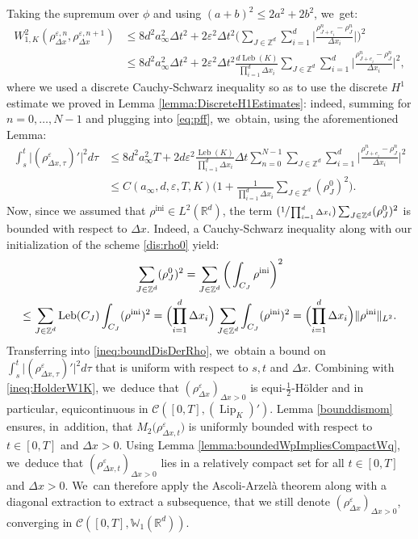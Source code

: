 \documentclass[11pt]{article}
\numberwithin{equation}{section}
\newcommand{\Psfrac}[2]{(\sfrac{#1}{#2})}
\newcommand{\ini}{\mathrm{ini}}
\DeclareMathOperator{\Leb}{Leb}
\DeclareMathOperator{\Lip}{Lip}
\def\RR{\mathbb{R}}
\def\ZZ{\mathbb{Z}}
\def\WW{\mathbb{W}}
\def\eps{\varepsilon}
\def\dt{\Delta t}
\def\dx{\Delta x}
\def\calC{{\mathcal C}}
\theoremstyle{plain}
\theoremstyle{definition}
\begin{document}
Taking the supremum over $\phi$ and using $(a + b)^2 \leq 2a^2 + 2b^2$, we~get:
\begin{align*}
W_{1,K}^2(\rho_{\dx}^{\eps,n}, \rho_{\dx}^{\eps,n+1}) & \leq 8d^2 a_\infty^2 \dt^2 + 2\eps^2 \dt^2 \bigg(\sum_{J \in \ZZ^d} \sum_{i=1}^{d} \Big|\frac{\rho_{J+e_i}^{n} - \rho_J^{n}}{\dx_i}\Big|\bigg)^2 \\
& \leq 8d^2 a_\infty^2 \dt^2 + 2 \eps^2 \dt^2 \frac{d \Leb(K)}{\prod_{i=1}^d \dx_i} \sum_{J \in \ZZ^d} \sum_{i=1}^{d} \Big|\frac{\rho_{J+e_i}^{n} - \rho_J^{n}}{\dx_i}\Big|^2,
\end{align*}
where we used a discrete Cauchy-Schwarz inequality so as to use the discrete $H^1$ estimate we proved in Lemma \ref{lemma:DiscreteH1Estimates}: indeed, summing for $n=0,\ldots, N-1$ and plugging into \eqref{eq:pff}, we~obtain, using the aforementioned Lemma:
\begin{equation}\label{ineq:boundDisDerRho}
\begin{aligned}
\int_s^t \big|(\rho_{\dx,\tau}^\eps)'\big|^2 d\tau & \leq 8d^2 a_\infty^2 T + 2 d \eps^2 \frac{\Leb(K)}{\prod_{i=1}^d \dx_i} \dt \sum_{n=0}^{N-1} \sum_{J \in \ZZ^d} \sum_{i=1}^{d} \Big|\frac{\rho_{J+e_i}^{n} - \rho_J^{n}}{\dx_i}\Big|^2 \\
& \leq C(a_\infty,d, \eps, T, K) \Big(1 + \frac{1}{\prod_{i=1}^d \dx_i}\sum_{J\in\ZZ^d}(\rho_J^0)^2 \Big).
\end{aligned}
\end{equation}
Now, since we assumed that $\rho^{\ini} \in L^2(\RR^d)$, the term $\Psfrac{1}{\prod_{i=1}^d \dx_i}\sum_{J\in\ZZ^d}(\rho_J^0)^2$ is bounded with respect to $\dx$. Indeed, a Cauchy-Schwarz inequality along with our initialization of the scheme \eqref{dis:rho0} yield:
\begin{multline*}
\sum_{J\in\ZZ^d}(\rho_J^0)^2 = \sum_{J\in\ZZ^d} \bigg(\int_{C_J} \rho^{\ini}\bigg)^2 \\
\leq \sum_{J\in\ZZ^d} \Leb(C_J) \int_{C_J}(\rho^{\ini})^2 = \Bigl(\prod_{i=1}^d \dx_i\Bigr) \sum_{J\in\ZZ^d} \int_{C_J}(\rho^{\ini})^2 = \Bigl(\prod_{i=1}^d \dx_i\Bigr) \|\rho^{\ini}\|_{L^2}.
\end{multline*}
Transferring into \eqref{ineq:boundDisDerRho}, we~obtain a bound on $\int_s^t \big|(\rho_{\dx,\tau}^\eps)'\big|^2 d\tau$ that is uniform with respect to $s, t$ and $\dx$. Combining with \eqref{ineq:HolderW1K}, we~deduce that $(\rho_{\dx}^\eps)_{\dx > 0}$ is equi-$\frac 12$\nobreakdash-Hölder and in particular, equicontinuous in $\calC([0,T], (\Lip_K)')$. Lemma \ref{bounddismom} ensures, in~addition, that $M_2\big(\rho_{\dx,t}^\eps\big)$ is uniformly bounded with respect to $t \in [0,T]$ and $\dx>0$. Using Lemma \ref{lemma:boundedWpImpliesCompactWq}, we~deduce that $(\rho_{\dx,t}^\eps)_{\dx > 0}$ lies in a relatively compact set for all $t \in [0,T]$ and $\dx>0$. We~can therefore apply the Ascoli-Arzelà theorem along with a diagonal extraction to extract a subsequence, that we still denote $(\rho_{\dx}^\eps)_{\dx > 0}$, converging in
$\calC([0,T], \WW_1(\RR^d))$.
\end{document}
